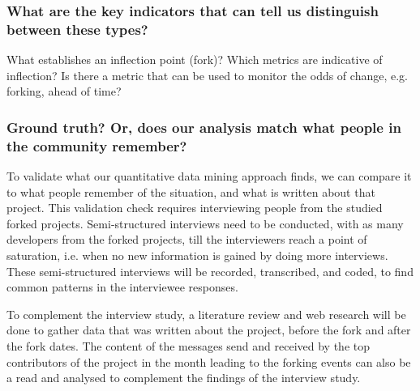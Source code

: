 \documentclass{acm_proc_article-sp}
\begin{document}
\subsubsection{What are the key indicators that can tell us distinguish between these types?\\}

What establishes an inflection point (fork)? Which metrics are indicative of inflection? Is there a metric that can be used to monitor the odds of change, e.g. forking, ahead of time?


\subsubsection{Ground truth? Or, does our analysis match what people in the community remember?\\} 

To validate what our quantitative data mining approach finds, we can compare it to what people remember of the situation, and what is written about that project. This validation check requires interviewing people from the studied forked projects. Semi-structured interviews need to be conducted, with as many developers from the forked projects, till the interviewers reach a point of saturation, i.e. when no new information is gained by doing more interviews. These semi-structured interviews will be recorded, transcribed, and coded, to find common patterns in the interviewee responses.

To complement the interview study, a literature review and web research will be done to gather data that was written about the project, before the fork and after the fork dates. The content of the messages send and received by the top contributors of the project in the month leading to the forking events can also be a read and analysed to complement the findings of the interview study. 
\end{document}
